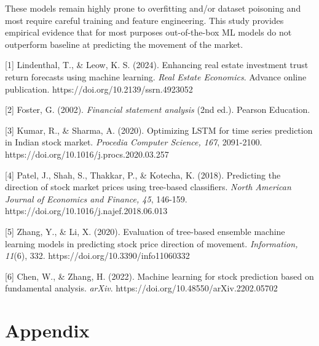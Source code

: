 \documentclass[11pt]{article}
\begin{document}
These models remain highly prone to overfitting and/or dataset poisoning and most require careful training and feature engineering. This study provides empirical evidence that for most purposes out-of-the-box ML models do not outperform baseline at predicting the movement of the market.

\begin{thebibliography}{9}

[1]  
Lindenthal, T., \& Leow, K. S. (2024). Enhancing real estate investment trust return forecasts using machine learning. \textit{Real Estate Economics}. Advance online publication. https://doi.org/10.2139/ssrn.4923052\\ \vspace{.5em}

[2]  
Foster, G. (2002). \textit{Financial statement analysis} (2nd ed.). Pearson Education.\\ \vspace{.5em}

[3]  
Kumar, R., \& Sharma, A. (2020). Optimizing LSTM for time series prediction in Indian stock market. \textit{Procedia Computer Science, 167}, 2091-2100. https://doi.org/10.1016/j.procs.2020.03.257\\ \vspace{.5em}

[4]  
Patel, J., Shah, S., Thakkar, P., \& Kotecha, K. (2018). Predicting the direction of stock market prices using tree-based classifiers. \textit{North American Journal of Economics and Finance, 45}, 146-159. https://doi.org/10.1016/j.najef.2018.06.013\\ \vspace{.5em}

[5]  
Zhang, Y., \& Li, X. (2020). Evaluation of tree-based ensemble machine learning models in predicting stock price direction of movement. \textit{Information, 11}(6), 332. https://doi.org/10.3390/info11060332\\ \vspace{.5em}

[6]  
Chen, W., \& Zhang, H. (2022). Machine learning for stock prediction based on fundamental analysis. \textit{arXiv}. https://doi.org/10.48550/arXiv.2202.05702

\end{thebibliography}

\newpage
\section{Appendix}
\end{document}
